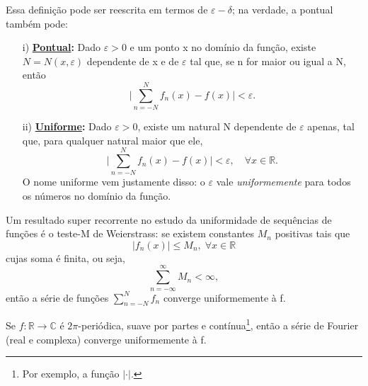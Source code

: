 \documentclass[../pde_notes.tex]{subfiles}
\begin{document}
Essa definição pode ser reescrita em termos de \(\varepsilon -\delta \); na verdade, a pontual também pode:
\begin{itemize}
	\item[i)] \textbf{\underline{Pontual}:} Dado \(\varepsilon > 0\) e um ponto x no domínio da função, existe \(N=N(x, \varepsilon )\) dependente de x e de \(\varepsilon \) tal que, se n for maior ou igual a N, então
	      \[
		      \biggl\vert \sum\limits_{n=-N}^{N}f_{n}(x) - f(x) \biggr\vert < \varepsilon .
	      \]
	\item[ii)] \textbf{\underline{Uniforme}:} Dado \(\varepsilon > 0\), existe um natural N dependente de \(\varepsilon \) apenas, tal que, para qualquer natural maior que ele,
	      \[
		      \biggl\vert \sum\limits_{n=-N}^{N}f_{n}(x) - f(x) \biggr\vert < \varepsilon , \quad \forall x\in \mathbb{R}.
	      \]
	      O nome uniforme vem justamente disso: o \(\varepsilon \) vale \textit{uniformemente} para todos os números no domínio da função.
\end{itemize}
\begin{tcolorbox}[
		skin=enhanced,
		title=Lembrete!,
		after title={\hfill O Teste-M de Weierstrass},
		fonttitle=\bfseries,
		sharp corners=downhill,
		colframe=black,
		colbacktitle=yellow!75!white,
		colback=yellow!30,
		colbacklower=black,
		coltitle=black,
		drop large lifted shadow
	]
	Um resultado super recorrente no estudo da uniformidade de sequências de funções é o \hypertarget{weierstrass_m}{teste-M de Weierstrass}: se existem constantes \(M_{n}\) positivas tais que
	\[
		|f_{n}(x)|\leq M_{n},\; \forall x\in \mathbb{R}
	\]
	cujas soma é finita, ou seja,
	\[
		\sum\limits_{n=-\infty}^{\infty}M_{n}<\infty,
	\]
	então a série de funções \(\sum\limits_{n=-N}^{N}f_{n}\) converge uniformemente à f.
\end{tcolorbox}
\begin{theorem*}
	Se \(f:\mathbb{R}\rightarrow \mathbb{C}\) é \(2\pi \)-periódica, suave por partes e contínua\footnote{Por exemplo, a função \(|\cdot |\).}, então a série de Fourier (real e complexa) converge uniformemente à f.
\end{theorem*}
\end{document}
